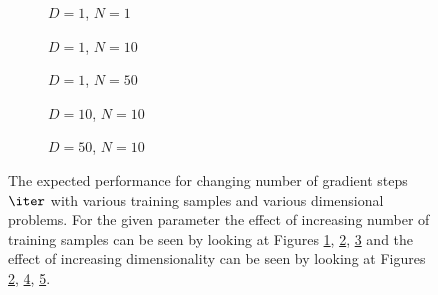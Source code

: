 \begin{figure}[!htb]
  \centering
    \begin{subfigure}{0.3\textwidth}
      \centering
      \caption{$D=1$, $N=1$}
      \label{fig:nonlinear-n_iter-N-1-D-1}
    \end{subfigure}
    \begin{subfigure}{0.3\textwidth}
      \centering
      \caption{$D=1$, $N=10$}
      \label{fig:nonlinear-n_iter-N-10-D-1}
    \end{subfigure}
    \begin{subfigure}{0.3\textwidth}
      \centering
      \caption{$D=1$, $N=50$}
      \label{fig:nonlinear-n_iter-N-50-D-1}
    \end{subfigure}

    \begin{subfigure}{0.3\textwidth}
      \centering
      \caption{$D=10$, $N=10$}
      \label{fig:nonlinear-n_iter-N-10-D-10}
    \end{subfigure}
    \begin{subfigure}{0.3\textwidth}
      \centering
      \caption{$D=50$, $N=10$}
      \label{fig:nonlinear-n_iter-N-10-D-50}
    \end{subfigure}  
  \caption{The expected performance for changing number of gradient steps $\iter$ with various training samples and various dimensional problems. For the given parameter the effect of increasing number of training samples can be seen by looking at Figures \ref{fig:nonlinear-n_iter-N-1-D-1}, \ref{fig:nonlinear-n_iter-N-10-D-1}, \ref{fig:nonlinear-n_iter-N-50-D-1} and the effect of increasing dimensionality can be seen by looking at Figures \ref{fig:nonlinear-n_iter-N-10-D-1}, \ref{fig:nonlinear-n_iter-N-10-D-10}, \ref{fig:nonlinear-n_iter-N-10-D-50}.}\label{fig:nonlinear-n_iter}
\end{figure}


